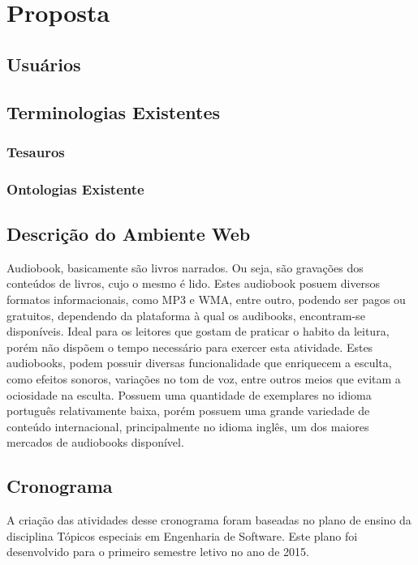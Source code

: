 \chapter{Proposta}\label{cap4}

\section{Usuários}


\section{Terminologias Existentes}

\subsection{Tesauros}

\subsection{Ontologias Existente}


\section{Descrição do Ambiente Web}
Audiobook, basicamente são livros narrados. Ou seja, são gravações dos conteúdos de livros, cujo o mesmo é lido. Estes audiobook posuem diversos formatos informacionais, como MP3 e WMA, entre outro, podendo ser pagos ou gratuitos, dependendo da plataforma à qual os audibooks, encontram-se disponíveis.
Ideal para os leitores que gostam de praticar o habito da leitura, porém não dispõem o tempo necessário para exercer esta atividade. Estes audiobooks, podem possuir diversas funcionalidade que enriquecem a esculta, como efeitos sonoros, variações no tom de voz, entre outros meios que evitam a ociosidade na esculta.
Possuem uma quantidade de exemplares no idioma português relativamente baixa, porém possuem uma grande variedade de conteúdo internacional, principalmente no idioma inglês, um dos maiores mercados de audiobooks disponível.

\section{Cronograma}
A criação das atividades desse cronograma foram baseadas no plano de ensino da disciplina Tópicos especiais em Engenharia de Software. Este plano foi desenvolvido para o primeiro semestre letivo no ano de 2015.


